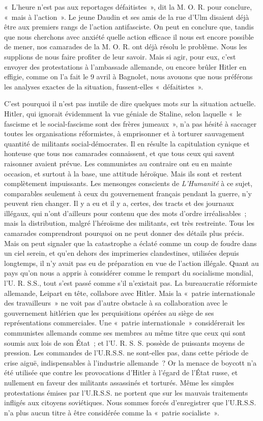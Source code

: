 \documentclass[french,twoside]{book} %
\begin{document}
« L'heure n'est pas aux reportages défaitistes », dit la M. O. R. pour conclure, « mais à l'action ». Le jeune Daudin et ses amis de la rue d'Ulm disaient déjà être aux premiers rangs de l'action antifasciste. On peut en conclure que, tandis que nous cherchons avec anxiété quelle action efficace il nous est encore possible de mener, nos camarades de la M. O. R. ont déjà résolu le problème. Nous les supplions de nous faire profiter de leur savoir. Mais si agir, pour eux, c'est envoyer des protestations à l'ambassade alle­mande, ou encore brûler Hitler en effigie, comme on l'a fait le 9 avril à Bagnolet, nous avouons que nous préférons les analyses exactes de la situation, fussent-elles « défaitistes ».\par
C'est pourquoi il n'est pas inutile de dire quelques mots sur la situation actuelle. Hitler, qui ignorait évidemment la vue géniale de Staline, selon laquelle « le fascisme et le social-fascisme sont des frères jumeaux », n'a pas hésité à saccager toutes les organisations réformistes, à emprisonner et à torturer sauvagement quantité de militants social-démocrates. Il en résulte la capitulation cynique et honteuse que tous nos camarades connaissent, et que tous ceux qui savent raisonner avaient prévue. Les communistes au contraire ont eu en mainte occasion, et surtout à la base, une attitude héroïque. Mais ils sont et restent complètement impuissants. Les mensonges conscients de {\itshape L’Humanité} à ce sujet, comparables seulement à ceux du gouvernement français pendant la guerre, n'y peuvent rien changer. Il y a eu et il y a, certes, des tracts et des journaux illégaux, qui n'ont d'ailleurs pour contenu que des mots d'ordre irréalisables ; mais la distribution, malgré l'héroïsme des mili­tants, est très restreinte. Tous les camarades comprendront pourquoi on ne peut donner des détails plus précis. Mais on peut signaler que la catastrophe a éclaté comme un coup de foudre dans un ciel serein, et qu'en dehors des imprimeries clandestines, utilisées depuis longtemps, il n'y avait pas eu de préparation en vue de l'action illégale. Quant au pays qu'on nous a appris à considérer comme le rempart du socialisme mondial, l'U. R. S.S., tout s'est passé comme s'il n'existait pas. La bureaucratie réformiste allemande, Leipart en tête, collabore avec Hitler. Mais la « patrie internationale des travailleurs » ne voit pas d'autre obstacle à sa collaboration avec le gouvernement hitlérien que les perquisitions opérées au siège de ses représentations commerciales. Une « patrie internationale » considérerait les communistes allemands comme ses membres au même titre que ceux qui sont soumis aux lois de son État ; et l'U. R. S. S. possède de puissants moyens de pression. Les commandes de l'U.R.S.S. ne sont-elles pas, dans cette période de crise aiguë, indispensables à l'industrie allemande ? Or la menace de boycott n'a été utilisée que contre les provocations d'Hitler à l'égard de l'État russe, et nullement en faveur des militants assassinés et torturés. Même les simples protestations émises par l'U.R.S.S. ne portent que sur les mauvais traitements infligés aux citoyens soviétiques. Nous sommes forcés d'enregistrer que l'U.R.S.S. n'a plus aucun titre à être considérée comme la « patrie socialiste ».\par
\end{document}
